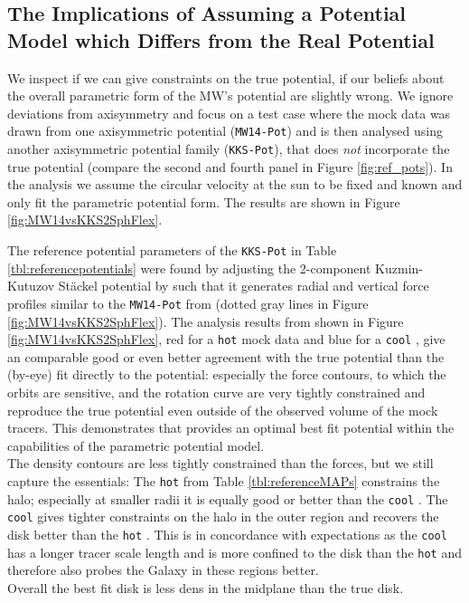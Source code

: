 \subsection{The Implications of Assuming a Potential Model which Differs from the Real Potential} \label{sec:results_potential}


We inspect if we can give constraints on the true potential, if our beliefs about the overall parametric form of the MW's potential are slightly wrong. We ignore deviations from axisymmetry and focus on a test case where the mock data was drawn from one axisymmetric potential (\texttt{MW14-Pot}) and is then analysed using another axisymmetric potential family (\texttt{KKS-Pot}), that does \emph{not} incorporate the true potential (compare the second and fourth panel in Figure \ref{fig:ref_pots}). In the analysis we assume the circular velocity at the sun to be fixed and known and only fit the parametric potential form. The results are shown in Figure \ref{fig:MW14vsKKS2SphFlex}.





The reference potential parameters of the \texttt{KKS-Pot} in Table \ref{tbl:referencepotentials} were found by adjusting the 2-component Kuzmin-Kutuzov St\"{a}ckel potential by \citet{bat94} such that it generates radial and vertical force profiles similar to the \texttt{MW14-Pot} from \citet{bov15} (dotted gray lines in Figure \ref{fig:MW14vsKKS2SphFlex}). The analysis results from \RM{} shown in Figure \ref{fig:MW14vsKKS2SphFlex}, red for a \texttt{hot} mock data \MAP{} and blue for a \texttt{cool} \MAP{}, give an comparable good or even better agreement with the true potential than the (by-eye) fit directly to the potential: especially the force contours, to which the orbits are sensitive, and the rotation curve are very tightly constrained and reproduce the true potential even outside of the observed volume of the mock tracers. This demonstrates that \RM{} provides an optimal best fit potential within the capabilities of the parametric potential model.
\\The density contours are less tightly constrained than the forces, but we still capture the essentials: The \texttt{hot} \MAP{} from Table \ref{tbl:referenceMAPs} constrains the halo; especially at smaller radii it is equally good or better than the \texttt{cool} \MAP{}. The \texttt{cool} \MAP{} gives tighter constraints on the halo in the outer region and recovers the disk better than the \texttt{hot} \MAP{}. This is in concordance with expectations as the \texttt{cool} \MAP{} has a longer tracer scale length and is more confined to the disk than the \texttt{hot} \MAP{} and therefore also probes the Galaxy in these regions better.
\\Overall the best fit disk is less dens in the midplane than the true disk. 

